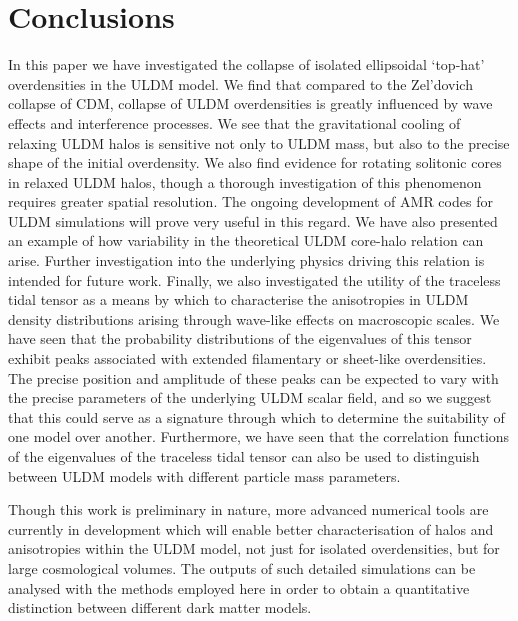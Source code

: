 \documentclass[a4paper,11pt]{article}
\begin{document}
\section{Conclusions}\label{sec:conclusion}

In this paper we have investigated the collapse of isolated ellipsoidal `top-hat' overdensities in the ULDM model. We find that compared to the Zel'dovich collapse of CDM, collapse of ULDM overdensities is greatly influenced by wave effects and interference processes. We see that the gravitational cooling of relaxing ULDM halos is sensitive not only to ULDM mass, but also to the precise shape of the initial overdensity. We also find evidence for rotating solitonic cores in relaxed ULDM halos, though a thorough investigation of this phenomenon requires greater spatial resolution. The ongoing development of AMR codes for ULDM simulations will prove very useful in this regard. We have also presented an example of how variability in the theoretical ULDM core-halo relation can arise. Further investigation into the underlying physics driving this relation is intended for future work. Finally, we also investigated the utility of the traceless tidal tensor as a means by which to characterise the anisotropies in ULDM density distributions arising through wave-like effects on macroscopic scales. We have seen that the probability distributions of the eigenvalues of this tensor exhibit peaks associated with extended filamentary or sheet-like overdensities. The precise position and amplitude of these peaks can be expected to vary with the precise parameters of the underlying ULDM scalar field, and so we suggest that this could serve as a signature through which to determine the suitability of one model over another. Furthermore, we have seen that the correlation functions of the eigenvalues of the traceless tidal tensor can also be used to distinguish between ULDM models with different particle mass parameters. 

Though this work is preliminary in nature, more advanced numerical tools are currently in development which will enable better characterisation of halos and anisotropies within the ULDM model, not just for isolated overdensities, but for large cosmological volumes. The outputs of such detailed simulations can be analysed with the methods employed here in order to obtain a quantitative distinction between different dark matter models. 
\end{document}

